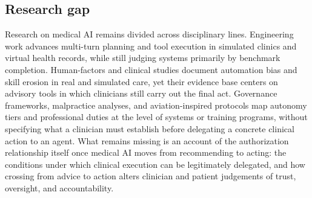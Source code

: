 \subsection{Research gap}

Research on medical AI remains divided across disciplinary lines. Engineering work advances multi-turn planning and tool execution in simulated clinics and virtual health records, while still judging systems primarily by benchmark completion. Human-factors and clinical studies document automation bias and skill erosion in real and simulated care, yet their evidence base centers on advisory tools in which clinicians still carry out the final act. Governance frameworks, malpractice analyses, and aviation-inspired protocols map autonomy tiers and professional duties at the level of systems or training programs, without specifying what a clinician must establish before delegating a concrete clinical action to an agent. What remains missing is an account of the authorization relationship itself once medical AI moves from recommending to acting: the conditions under which clinical execution can be legitimately delegated, and how crossing from advice to action alters clinician and patient judgements of trust, oversight, and accountability.
